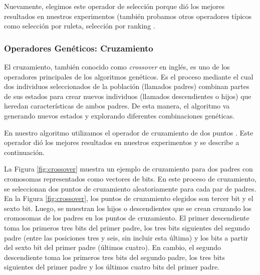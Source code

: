 Nuevamente, elegimos este operador de selección porque dió los mejores resultados en nuestros experimentos (también probamos otros operadores típicos como selección por ruleta, selección por ranking \cite{Goldberg:1989}.


\subsubsection{Operadores Genéticos: Cruzamiento}

El cruzamiento, también conocido como \emph{crossover} en inglés, es uno de los operadores principales de los algoritmos genéticos. Es el proceso mediante el cual dos individuos seleccionados de la población (llamados padres) combinan partes de sus estados para crear nuevos individuos (llamados descendientes o hijos) que heredan características de ambos padres. De esta manera, el algoritmo va generando nuevos estados y explorando diferentes combinaciones genéticas.

En nuestro algoritmo utilizamos el operador de cruzamiento de dos puntos \cite{goldberg1989genetic}. Este operador dió los mejores resultados en nuestros experimentos y se describe a continuación. 

La Figura \ref{fig:crossover} muestra un ejemplo de cruzamiento para dos padres con cromosomas representados como vectores de bits. En este proceso de cruzamiento, se seleccionan dos puntos de cruzamiento aleatoriamente para cada par de padres. En la Figura \ref{fig:crossover}, los puntos de cruzamiento elegidos son  tercer bit y el sexto bit. Luego, se muestran los hijos o descendientes que se crean cruzando los cromosomas de los padres en los puntos de cruzamiento. El primer descendiente toma los primeros tres bits del primer padre, los tres bits siguientes del segundo padre (entre las posiciones tres y seis, sin incluir esta última) y los bits a partir del sexto bit del primer padre (últimos cuatro). En cambio, el segundo descendiente toma los primeros tres bits del segundo padre, los tres bits siguientes del primer padre y los últimos cuatro bits del primer padre.


